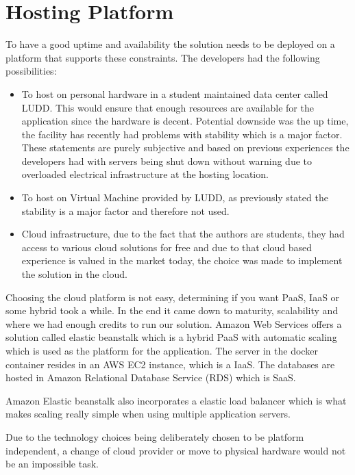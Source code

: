 \documentclass[12pt,a4paper]{report}
\begin{document}
\section{Hosting Platform}
To have a good uptime and availability the solution needs to be deployed on a platform that supports these constraints. The developers had the following possibilities:

\begin{itemize}
    \item To host on personal hardware in a student maintained data center called LUDD. This would ensure that enough resources are available for the application since the hardware is decent. Potential downside was the up time, the facility has recently had problems with stability which is a major factor. These statements are purely subjective and based on previous experiences the developers had with servers being shut down without warning due to overloaded electrical infrastructure at the hosting location.
    \item To host on Virtual Machine provided by LUDD, as previously stated the stability is a major factor and therefore not used.
    \item Cloud infrastructure, due to the fact that the authors are students, they had access to various cloud solutions for free and due to that cloud based experience is valued in the market today, the choice was made to implement the solution in the cloud.
\end{itemize}

Choosing the cloud platform is not easy, determining if you want PaaS, IaaS or some hybrid took a while. In the end it came down to maturity, scalability and where we had enough credits to run our solution. Amazon Web Services offers a solution called elastic beanstalk which is a hybrid PaaS with automatic scaling which is used as the platform for the application. The server in the docker container resides in an AWS EC2 instance, which is a IaaS. The databases are hosted in Amazon Relational Database Service (RDS) which is SaaS. 

Amazon Elastic beanstalk also incorporates a elastic load balancer which is what makes scaling really simple when using multiple application servers. 

Due to the technology choices being deliberately chosen to be platform independent, a change of cloud provider or move to physical hardware would not be an impossible task.
\end{document}
